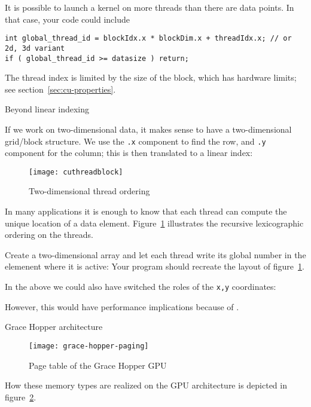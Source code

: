 It is possible to launch a kernel on more threads than
there are data points. In that case, your code could include
\begin{lstlisting}
int global_thread_id = blockIdx.x * blockDim.x + threadIdx.x; // or 2d, 3d variant
if ( global_thread_id >= datasize ) return;
\end{lstlisting}

The thread index is limited by the size of the block, which has
hardware limits; see section~\ref{sec:cu-properties}.

 {Beyond linear indexing}

If we work on two-dimensional data, it makes sense to have
a two-dimensional grid/block structure.
We use the \lstinline{.x} component to find the row,
and \lstinline{.y} component for the column;
this is then translated to a linear index:
%

\begin{figure}[ht]
  \texttt{[image: cuthreadblock]}
  \caption{Two-dimensional thread ordering}
  \label{fig:cu-thread-block}
\end{figure}
In many applications it is enough to know that each thread can
compute the unique location of a data element.
Figure~\ref{fig:cu-thread-block} illustrates the recursive
lexicographic ordering on the threads.

\begin{exercise}
  \label{ex:print2b2}
  Create a two-dimensional array and let each thread write its global number
  in the elemenent where it is active:
  Your program should recreate the layout of figure~\ref{fig:cu-thread-block}.
\end{exercise}

In the above we could also have switched the roles of the \lstinline{x,y} coordinates:
%

However, this would have performance implications
because of .





 {Grace Hopper architecture}

\begin{figure}[ht]
  \texttt{[image: grace-hopper-paging]}
  \caption{Page table of the Grace Hopper GPU}
  \label{fig:grace-hopper-paging}
\end{figure}
How these memory types are realized on the
GPU architecture is depicted in figure~\ref{fig:grace-hopper-paging}.

